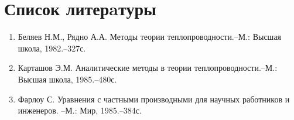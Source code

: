 \documentclass[12pt, a4paper]{article}
\begin{document}
\section*{Список литерaтуры}
\begin{enumerate}
  \item Беляев Н.М., Рядно А.А. Методы теории теплопроводности.--М.: Высшая школа, 1982.--327с.
  \item Карташов Э.М. Аналитические методы в теории теплопроводности.--М.: Высшая школа, 1985.--480с.
  \item Фарлоу С. Уравнения с частными производными для научных работников и инженеров. --М.: Мир, 1985.--384с.
\end{enumerate}
\end{document}
